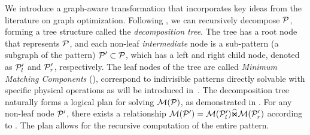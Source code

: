 We introduce a graph-aware transformation that incorporates key ideas from the literature on graph optimization. Following , we can recursively decompose $\mathcal{P}$, forming a tree structure called the \emph{decomposition tree}. The tree has a root node that represents $\mathcal{P}$, and each non-leaf \emph{intermediate} node is a sub-pattern (a subgraph of the pattern) $\mathcal{P}' \subset \mathcal{P}$, which has a left and right child node, denoted as $\mathcal{P}'_l$ and $\mathcal{P}'_r$, respectively. %
The leaf nodes of the tree are called \emph{Minimum Matching Components} (\mmc), correspond to indivisible patterns directly solvable with specific physical operations
as will be introduced in~. The decomposition tree naturally forms a logical plan for solving $\mathcal{M}(\mathcal{P})$, as demonstrated in . For any non-leaf node $\mathcal{P}'$, there exists a relationship $\mathcal{M}(\mathcal{P}') = \mathcal{M}(\mathcal{P}'_l) \widehat{\Join} \mathcal{M}(\mathcal{P}'_r)$ according to . The plan allows for the recursive computation of the entire pattern.

